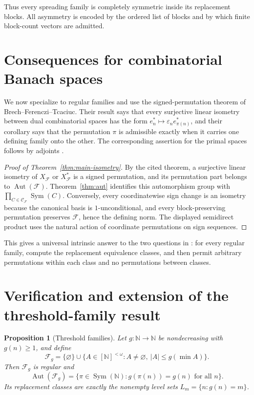 \documentclass[11pt]{article}
\newtheorem{proposition}[theorem]{Proposition}
\theoremstyle{definition}
\theoremstyle{remark}
\newcommand{\N}{\mathbb N}
\newcommand{\F}{\mathcal F}
\newcommand{\Ccal}{\mathcal C}
\newcommand{\Aut}{\operatorname{Aut}}
\newcommand{\Sym}{\operatorname{Sym}}
\begin{document}
Thus every spreading family is completely symmetric inside its replacement
blocks.  All asymmetry is encoded by the ordered list of blocks and by which
finite block-count vectors are admitted.

\section{Consequences for combinatorial Banach spaces}

We now specialize to regular families and use the signed-permutation theorem
of Brech--Ferenczi--Tcaciuc.  Their result says that every surjective linear
isometry between dual combinatorial spaces has the form
$e_n^*\mapsto\varepsilon_n e_{\pi(n)}^*$, and their corollary says that the
permutation $\pi$ is admissible exactly when it carries one defining family
onto the other.  The corresponding assertion for the primal spaces follows
by adjoints \cite[Theorem~10 and Corollary~12]{BFT}.

\begin{proof}[Proof of Theorem~\ref{thm:main-isometry}]
By the cited theorem, a surjective linear isometry of $X_{\F}$ or
$X_{\F}^{*}$ is a signed permutation, and its permutation part belongs to
$\Aut(\F)$.  Theorem~\ref{thm:aut} identifies this automorphism group with
$\prod_{C\in\Ccal_{\F}}\Sym(C)$.  Conversely, every coordinatewise sign
change is an isometry because the canonical basis is $1$-unconditional, and
every block-preserving permutation preserves $\F$, hence the defining norm.
The displayed semidirect product uses the natural action of coordinate
permutations on sign sequences.
\end{proof}

This gives a universal intrinsic answer to the two questions in
\cite{BFT}: for every regular family, compute the replacement equivalence
classes, and then permit arbitrary permutations within each class and no
permutations between classes.

\section{Verification and extension of the threshold-family result}
\label{sec:threshold}

\begin{proposition}[Threshold families]\label{prop:threshold}
Let $g:\N\to\N$ be nondecreasing with $g(n)\ge1$, and define
\[
  \F_g=\{\varnothing\}\cup
  \{A\in[\N]^{<\omega}:A\ne\varnothing,
       \ |A|\le g(\min A)\}.
\]
Then $\F_g$ is regular and
\[
  \Aut(\F_g)
  =\{\pi\in\Sym(\N):g(\pi(n))=g(n)\text{ for all }n\}.
  \tag{5.1}\label{eq:threshold-aut}
\]
Its replacement classes are exactly the nonempty level sets
$L_m=\{n:g(n)=m\}$.
\end{proposition}
\end{document}
